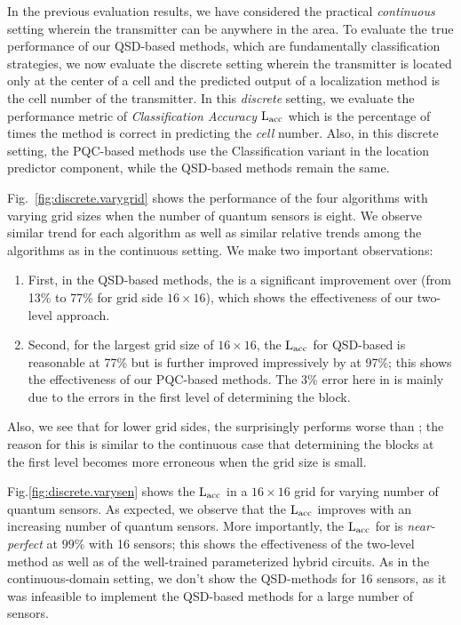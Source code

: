 In the previous evaluation results, we have considered the practical {\em continuous} setting wherein the transmitter can be anywhere in the area.
To evaluate the true performance of our QSD-based methods, which are fundamentally classification strategies, we now evaluate the discrete setting
wherein the transmitter is located only at the center of a cell and the 
predicted output of a localization method is the cell number of the transmitter.
In this {\em discrete} setting, we evaluate the performance metric of {\em Classification Accuracy} $\mathrm{L_{acc}}$ which is the percentage of times the method is correct in predicting the {\em cell} number. 
Also, in this discrete setting, the PQC-based methods use the Classification variant in the location predictor component, while the QSD-based methods remain the same.

Fig.~\ref{fig:discrete.varygrid} shows the performance of the four algorithms with varying grid sizes when the number of quantum sensors is eight. We observe similar trend for each algorithm as well as similar relative trends among the
algorithms as in the continuous setting. 
We make two important observations: 
\begin{enumerate}
    \item First, in the QSD-based methods, the \povm is a significant improvement over \povmone (from 13\% to 77\% for grid side $16\times16$), which shows the effectiveness of our two-level approach.
    \item Second, for the largest grid size of $16\times16$, the $\mathrm{L_{acc}}$ for QSD-based \povm is reasonable at 77\% but is further 
improved impressively by \pqctwo at 97\%; this shows the effectiveness of our PQC-based methods. The 3\% error here in \pqctwo is mainly due to the errors in the first level of determining the block.
\end{enumerate}
Also, we see that for lower grid sides, the \povm surprisingly performs worse than \povmone; the 
reason for this is similar to the continuous case that determining the blocks at the first level becomes more erroneous when the grid size is small.






Fig.\ref{fig:discrete.varysen} shows the $\mathrm{L_{acc}}$ in a $16\times16$ grid for varying number of quantum sensors. As expected, we observe that the $\mathrm{L_{acc}}$ improves with an increasing number of quantum sensors. More importantly, the $\mathrm{L_{acc}}$ for \pqctwo is {\em near-perfect} 
at $99\%$ with 16 sensors; this shows the effectiveness of the two-level method as well
as of the well-trained parameterized hybrid circuits. As in the continuous-domain setting, we don't show the QSD-methods for 16 sensors, as it was infeasible to implement the QSD-based methods for a large number of sensors.

